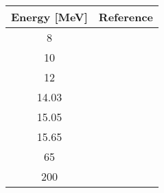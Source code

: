 \begin{tabular}{c c} 
    \toprule 
    \bf{Energy [MeV]} & \bf{Reference} \\
    \midrule
    8 & \cite{Liers71}\\
    10 & \cite{Liers71}\\
    12 & \cite{Liers71}\\
    14.03 & \cite{Lombardi72}\\
    15.05 & \cite{Lombardi72}\\
    15.65 & \cite{Lombardi72}\\
    65 & \cite{Noro81}\\
    200 & \cite{Murdock87}\\
    \bottomrule
\end{tabular}
